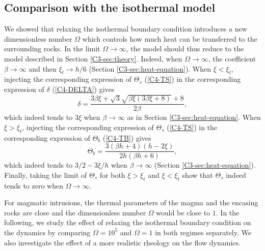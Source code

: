 \subsection{Comparison with the isothermal model}
\label{C4-sec:some-limits}

We showed that relaxing the isothermal boundary condition introduces a
new dimensionless number $\Omega$ which  controls how much heat can be
transferred    to   the    surrounding    rocks.     In   the    limit
$\Omega \rightarrow \infty$, the model should thus reduce to the model
described    in    Section    \ref{C3-sec:theory}.     Indeed,    when
$\Omega\rightarrow \infty$, the  coefficient $\beta\rightarrow \infty$
and then $\xi_t\rightarrow  h/6$ (Section \ref{C3-sec:heat-equation}).
When $\xi<\xi_t$, injecting the corresponding expression of $\Theta_s$
(\ref{C4-TS})   in   the    corresponding   expression   of   $\delta$
(\ref{C4-DELTA}) gives
\begin{equation}
  \delta =\frac{3 \beta \xi +\sqrt{3} \sqrt{\beta \xi (3 \beta \xi +8)}+8}{2 \beta },
\end{equation}
which indeed  tends to  $3\xi$ when $\beta  \rightarrow \infty$  as in
Section \ref{C3-sec:heat-equation}.   When $\xi>\xi_t$,  injecting the
corresponding   expression   of   $\Theta_s$  (\ref{C4-TS})   in   the
corresponding expression of $\Theta_b$ (\ref{C4-TB}) gives
\begin{equation}
  \Theta_b = \frac{3 (\beta  h+4) (h-2 \xi )}{2 h (\beta  h+6)},
\end{equation}
which  indeed tends  to $3/2-3\xi/h$  when $\beta  \rightarrow \infty$
(Section  \ref{C3-sec:heat-equation}). Finally,  taking  the limit  of
$\Theta_s$ for  both $\xi>\xi_t$ and $\xi<\xi_t$  show that $\Theta_s$
indeed tends to zero when $\Omega\rightarrow \infty$.

For magmatic intrusions,  the thermal parameters of the  magma and the
encasing rocks are  close and the dimensionless  number $\Omega$ would
be close to $1$. In the following, we study the effect of relaxing the
isothermal   boundary  condition   on   the   dynamics  by   comparing
$\Omega=10^5$ and  $\Omega = 1$  in both regimes separately.   We also
investigate  the effect  of  a  more realistic  rheology  on the  flow
dynamics.

